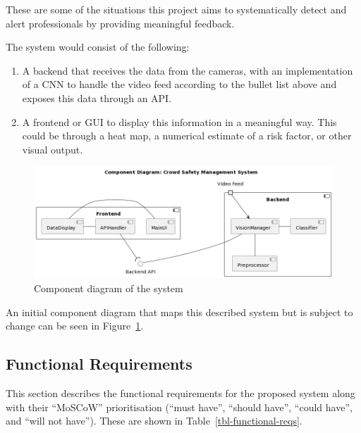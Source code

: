 \documentclass[
]{article}
\providecommand{\tightlist}{%
  \setlength{\itemsep}{0pt}\setlength{\parskip}{0pt}}\usepackage{longtable,booktabs,array}
\begin{document}
These are some of the situations this project aims to systematically
detect and alert professionals by providing meaningful feedback.

The system would consist of the following:

\begin{enumerate}
\def\labelenumi{\arabic{enumi}.}
\tightlist
\item
  A backend that receives the data from the cameras, with an
  implementation of a CNN to handle the video feed according to the
  bullet list above and exposes this data through an API.
\item
  A frontend or GUI to display this information in a meaningful way.
  This could be through a heat map, a numerical estimate of a risk
  factor, or other visual output.
\end{enumerate}

\begin{figure}

{\centering \includegraphics[width=\textwidth,height=0.5\textheight]{../images/component-diagram-1.png}

}

\caption{\label{fig-component-diagram}Component diagram of the system}

\end{figure}

An initial component diagram that maps this described system but is
subject to change can be seen in Figure~\ref{fig-component-diagram}.

\hypertarget{sec-functional-requirements}{%
\subsection{Functional Requirements}\label{sec-functional-requirements}}

This section describes the functional requirements for the proposed
system along with their ``MoSCoW'' prioritisation (``must have'',
``should have'', ``could have'', and ``will not have''). These are shown
in Table~\ref{tbl-functional-reqs}.
\end{document}
